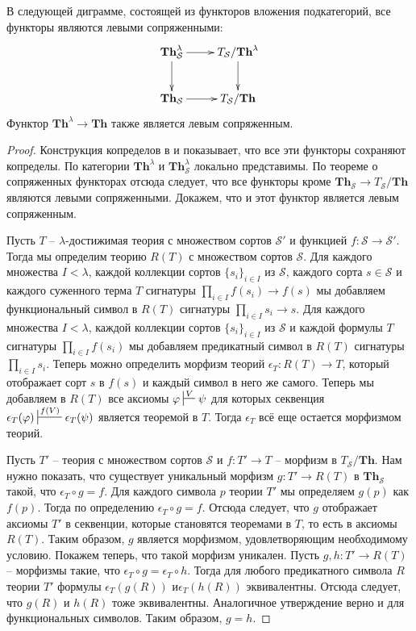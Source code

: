 \documentclass[reqno]{amsart}
\theoremstyle{definition}
\theoremstyle{remark}
\newcommand{\bcat}[1]{\mathbf{#1}}
\newcommand{\Th}{\bcat{Th}}
\begin{document}
\begin{prop}[th-adj]
В следующей диграмме, состоящей из функторов вложения подкатегорий, все функторы являются левыми сопряженными:
\[ \xymatrix{ \Th_\mathcal{S}^\lambda \ar[r] \ar[d] & T_\mathcal{S}/\Th^\lambda \ar[d] \\
              \Th_\mathcal{S}         \ar[r]        & T_\mathcal{S}/\Th
            } \]
Функтор $\Th^\lambda \to \Th$ также является левым сопряженным.
\end{prop}
\begin{proof}
Конструкция копределов в  и  показывает, что все эти функторы сохраняют копределы.
По  категории $\Th^\lambda$ и $\Th_\mathcal{S}^\lambda$ локально представимы.
По теореме о сопряженных функторах отсюда следует, что все функторы кроме $\Th_\mathcal{S} \to T_\mathcal{S}/\Th$ являются левыми сопряженными.
Докажем, что и этот функтор является левым сопряженным.

Пусть $T$ -- $\lambda$-достижимая теория с множеством сортов $\mathcal{S}'$ и функцией $f : \mathcal{S} \to \mathcal{S'}$.
Тогда мы определим теорию $R(T)$ с множеством сортов $\mathcal{S}$.
Для каждого множества $I < \lambda$, каждой коллекции сортов $\{ s_i \}_{i \in I}$ из $\mathcal{S}$, каждого сорта $s \in \mathcal{S}$ и каждого суженного терма $T$ сигнатуры $\prod_{i \in I} f(s_i) \to f(s)$
мы добавляем функциональный символ в $R(T)$ сигнатуры $\prod_{i \in I} s_i \to s$.
Для каждого множества $I < \lambda$, каждой коллекции сортов $\{ s_i \}_{i \in I}$ из $\mathcal{S}$ и каждой формулы $T$ сигнатуры $\prod_{i \in I} f(s_i)$
мы добавляем предикатный символ в $R(T)$ сигнатуры $\prod_{i \in I} s_i$.
Теперь можно определить морфизм теорий $\epsilon_T : R(T) \to T$, который отображает сорт $s$ в $f(s)$ и каждый символ в него же самого.
Теперь мы добавляем в $R(T)$ все аксиомы $\varphi \sststile{}{V} \psi$ для которых секвенция $\epsilon_T(\varphi) \sststile{}{f(V)} \epsilon_T(\psi)$ является теоремой в $T$.
Тогда $\epsilon_T$ всё еще остается морфизмом теорий.

Пусть $T'$ -- теория с множеством сортов $\mathcal{S}$ и $f : T' \to T$ -- морфизм в $T_\mathcal{S}/\Th$.
Нам нужно показать, что существует уникальный морфизм $g : T' \to R(T)$ в $\Th_\mathcal{S}$ такой, что $\epsilon_T \circ g = f$.
Для каждого символа $p$ теории $T'$ мы определяем $g(p)$ как $f(p)$.
Тогда по определению $\epsilon_T \circ g = f$.
Отсюда следует, что $g$ отображает аксиомы $T'$ в секвенции, которые становятся теоремами в $T$, то есть в аксиомы $R(T)$.
Таким образом, $g$ является морфизмом, удовлетворяющим необходимому условию.
Покажем теперь, что такой морфизм уникален.
Пусть $g,h : T' \to R(T)$ -- морфизмы такие, что $\epsilon_T \circ g = \epsilon_T \circ h$.
Тогда для любого предикатного символа $R$ теории $T'$ формулы $\epsilon_T(g(R))$ и$\epsilon_T(h(R))$ эквивалентны.
Отсюда следует, что $g(R)$ и $h(R)$ тоже эквивалентны.
Аналогичное утверждение верно и для функциональных символов.
Таким образом, $g = h$.
\end{proof}
\end{document}
